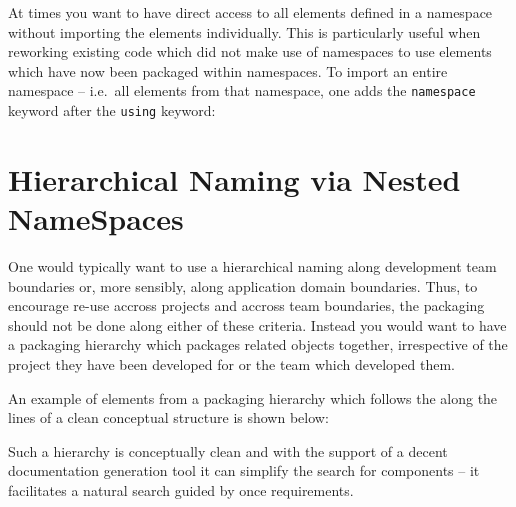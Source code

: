 At times you want to have direct access to all elements defined in a 
namespace without importing the elements individually. This is 
particularly useful when reworking existing code which did not make use
of namespaces to use elements which have now been packaged within 
namespaces. To import an entire namespace -- i.e.\ all elements from
that namespace, one adds the \verb+namespace+ keyword after the
\verb+using+ keyword:



\section{Hierarchical Naming via Nested NameSpaces}

One would typically want to use a hierarchical naming along development
team boundaries or, more sensibly, along application domain
boundaries. Thus, to encourage re-use accross projects and
accross team boundaries, the packaging should not be done along
either of these criteria. Instead you would want to have a
packaging hierarchy which packages related objects together,
irrespective of the project they have been developed for or
the team which developed them.

An example of elements from a packaging hierarchy which follows the 
along the lines of a clean conceptual structure is shown below:


Such a hierarchy is conceptually clean and with the support of a
decent documentation generation tool it can simplify the search 
for components -- it facilitates a natural search guided by once 
requirements.

